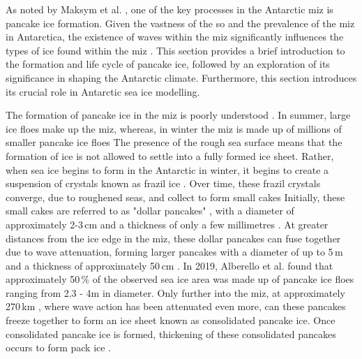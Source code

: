 As noted by Maksym et al. \cite{Maksym2012}, one of the key processes in the Antarctic \acs{miz} is pancake ice formation. Given the vastness of the \acs{so} and the prevalence of the \acs{miz} in Antarctica, the existence of waves within the \ac{miz} significantly influences the types of ice found within the \acs{miz} \cite{Brouwer2022}. This section provides a brief introduction to the formation and life cycle of pancake ice, followed by an exploration of its significance in shaping the Antarctic climate. Furthermore, this section introduces its crucial role in Antarctic sea ice modelling.

The formation of pancake ice in the \acs{miz} is poorly understood \cite{Doble2003}. In summer, large ice floes make up the \acs{miz}, whereas, in winter the \acs{miz} is made up of millions of smaller pancake ice floes \cite{Alberello2019,Alberello2021b} The presence of the rough sea surface means that the formation of ice is not allowed to settle into a fully formed ice sheet. Rather, when sea ice begins to form in the Antarctic in winter, it begins to create a suspension of crystals known as frazil ice \cite{Doble2003,Wadhams1999}. Over time, these frazil crystals converge, due to roughened seas, and collect to form small cakes \cite{Doble2003,Dierking2013} Initially, these small cakes are referred to as "dollar pancakes" \cite{Wadhams1999}, with a diameter of approximately 2-3\,cm and a thickness of only a few millimetres \cite{Doble2003,Wadhams1999}. At greater distances from the ice edge in the \acs{miz}, these dollar pancakes can fuse together due to wave attenuation, forming larger pancakes with a diameter of up to 5\,m and a thickness of approximately 50\,cm \cite{Wadhams1999,Aulicino2014,Doble2003}. In 2019, Alberello et al. \cite{Alberello2019} found that approximately 50\,\% of the observed sea ice area was made up of pancake ice floes ranging from 2.3 - 4m in diameter. Only further into the \acs{miz}, at approximately 270\,km \cite{Wadhams1987}, where wave action has been attenuated even more, can these pancakes freeze together to form an ice sheet known as consolidated pancake ice. Once consolidated pancake ice is formed, thickening of these consolidated pancakes occurs to form pack ice \cite{Doble2003}. 


